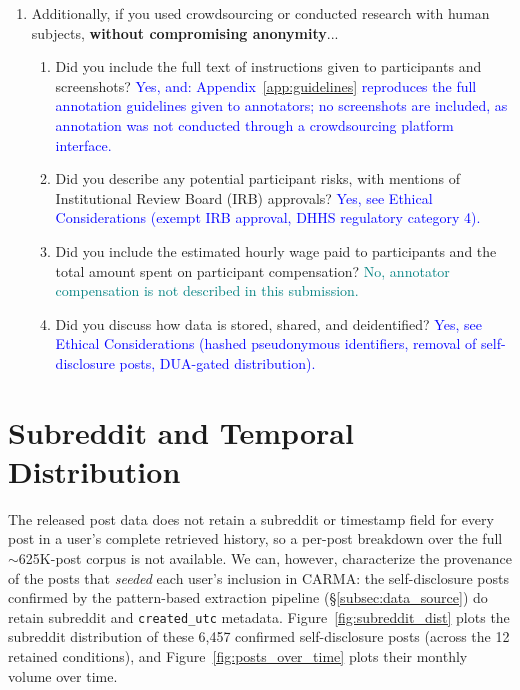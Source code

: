 \documentclass[letterpaper]{article} %
\newcommand{\answerYes}[1]{\textcolor{blue}{#1}}
\newcommand{\answerNo}[1]{\textcolor{teal}{#1}}
\begin{document}
\begin{enumerate}
\item Additionally, if you used crowdsourcing or conducted research with human subjects, \textbf{without compromising anonymity}...
\begin{enumerate}
  \item Did you include the full text of instructions given to participants and screenshots?
    \answerYes{Yes, and: Appendix~\ref{app:guidelines} reproduces the full annotation guidelines given to annotators; no screenshots are included, as annotation was not conducted through a crowdsourcing platform interface.}
  \item Did you describe any potential participant risks, with mentions of Institutional Review Board (IRB) approvals?
    \answerYes{Yes, see Ethical Considerations (exempt IRB approval, DHHS regulatory category 4).}
  \item Did you include the estimated hourly wage paid to participants and the total amount spent on participant compensation?
    \answerNo{No, annotator compensation is not described in this submission.}
   \item Did you discuss how data is stored, shared, and deidentified?
   \answerYes{Yes, see Ethical Considerations (hashed pseudonymous identifiers, removal of self-disclosure posts, DUA-gated distribution).}
\end{enumerate}

\end{enumerate}

\appendix

\section{Subreddit and Temporal Distribution}
\label{app:subreddit_time}

The released post data does not
retain a subreddit or timestamp field for every post in a user's
complete retrieved history, so a per-post breakdown over the full
$\sim$625K-post corpus is not available. We can, however, characterize
the provenance of the posts that \textit{seeded} each user's inclusion
in CARMA: the self-disclosure posts confirmed by the pattern-based
extraction pipeline (\S\ref{subsec:data_source}) do retain subreddit
and \texttt{created\_utc} metadata. Figure~\ref{fig:subreddit_dist}
plots the subreddit distribution of these 6,457 confirmed
self-disclosure posts (across the 12 retained conditions), and
Figure~\ref{fig:posts_over_time} plots their monthly volume over time.
\end{document}
